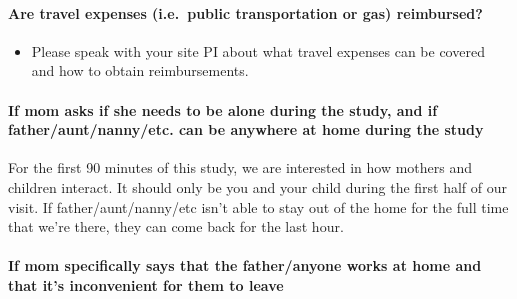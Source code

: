 \documentclass[
]{book}
\providecommand{\tightlist}{%
  \setlength{\itemsep}{0pt}\setlength{\parskip}{0pt}}
\begin{document}
\hypertarget{are-travel-expenses-i.e.-public-transportation-or-gas-reimbursed}{%
\paragraph*{Are travel expenses (i.e.~public transportation or gas) reimbursed?}\label{are-travel-expenses-i.e.-public-transportation-or-gas-reimbursed}}

\begin{itemize}
\tightlist
\item
  Please speak with your site PI about what travel expenses can be covered and how to obtain reimbursements.
\end{itemize}

\hypertarget{if-mom-asks-if-she-needs-to-be-alone-during-the-study-and-if-fatherauntnannyetc.-can-be-anywhere-at-home-during-the-study}{%
\paragraph*{If mom asks if she needs to be alone during the study, and if father/aunt/nanny/etc. can be anywhere at home during the study}\label{if-mom-asks-if-she-needs-to-be-alone-during-the-study-and-if-fatherauntnannyetc.-can-be-anywhere-at-home-during-the-study}}

For the first 90 minutes of this study, we are interested in how mothers and children interact. It should only be you and your child during the first half of our visit. If father/aunt/nanny/etc isn't able to stay out of the home for the full time that we're there, they can come back for the last hour.

\hypertarget{if-mom-specifically-says-that-the-fatheranyone-works-at-home-and-that-its-inconvenient-for-them-to-leave}{%
\paragraph*{If mom specifically says that the father/anyone works at home and that it's inconvenient for them to leave}\label{if-mom-specifically-says-that-the-fatheranyone-works-at-home-and-that-its-inconvenient-for-them-to-leave}}
\end{document}
